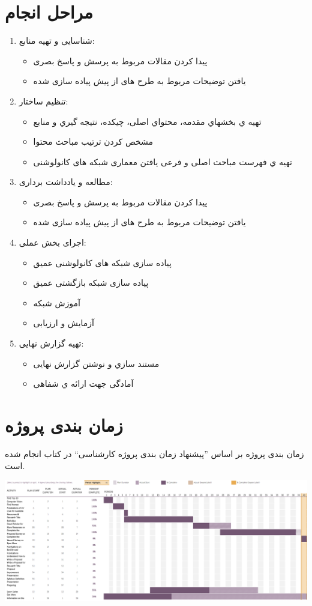 \documentclass[paper=A4, fontsize=11pt]{article}
\numberwithin{equation}{section}
\numberwithin{figure}{section}
\numberwithin{table}{section}
\begin{document}
\section{مراحل انجام}
\par
\begin{enumerate}
\item شناسایی و تهیه منابع:
	\begin{itemize}
			\item پیدا کردن مقالات مربوط به پرسش و پاسخ بصری
			\item یافتن توضیحات مربوط به طرح های از پیش پیاده سازی شده
	\end{itemize}

\item تنظیم ساختار:
	\begin{itemize}
			\item تهیه ي بخشهاي مقدمه، محتواي اصلی، چیکده، نتیجه گیري و منابع
			\item مشخص کردن ترتیب مباحث محتوا
			\item تهیه ي فهرست مباحث اصلی و فرعی یافتن معماری شبکه های کانولوشنی
	\end{itemize}

\item مطالعه و یادداشت برداری:
	\begin{itemize}
		\item پیدا کردن مقالات مربوط به پرسش و پاسخ بصری
		\item یافتن توضیحات مربوط به طرح های از پیش پیاده سازی شده
	\end{itemize}

\item اجرای بخش عملی:
	\begin{itemize}
			\item پیاده سازی شبکه های کانولوشنی عمیق 
			\item پیاده سازی شبکه بازگشتی عمیق
			\item آموزش شبکه 
			\item آزمایش و ارزیابی
	\end{itemize}

\item تهیه گزارش نهایی:
	\begin{itemize}
			\item مستند سازي و نوشتن گزارش نهایی
			\item آمادگی جهت ارائه ي شفاهی
	\end{itemize}
\end{enumerate}

\newpage
\section{زمان بندی پروژه}
\par
زمان بندی پروژه بر اساس ”پیشنهاد زمان بندی پروژه کارشناسی“ در کتاب انجام شده است.

\includegraphics[scale=0.25]{gantt}
\par
\end{document}
